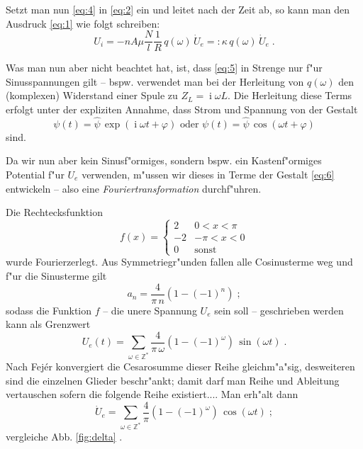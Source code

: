 \documentclass[a4paper,12pt]{article}
\newcommand{\I}{\ensuremath{\operatorname{i}}}
\newcommand{\abs}[0]{\bigskip\noindent}
\begin{document}
Setzt man nun  \eqref{eq:4} in \eqref{eq:2} ein und leitet nach der
Zeit ab, so kann man den Ausdruck \eqref{eq:1} wie folgt schreiben:
\begin{equation}
  \label{eq:5}
  U_i = - n A \mu \frac{N}{l} \frac{1}{R} \, q(\omega) \, \dot U_e =:
  \kappa \, q(\omega) \, \dot U_e \;.
\end{equation}

Was man nun aber nicht beachtet hat, ist, dass \eqref{eq:5} in Strenge
nur f"ur Sinusspannungen gilt -- bspw. verwendet man bei der
Herleitung von $q(\omega)$ den (komplexen) Widerstand einer Spule zu $Z_L = \I
\omega L$. Die Herleitung diese Terms erfolgt unter der expliziten
Annahme, dass Strom und Spannung von der Gestalt 
\begin{equation}
  \label{eq:6}
\psi(t) = \hat \psi \,\exp( \I \omega t + \varphi)  \text{ oder }
\psi(t) = \hat \psi \, \cos( \omega t + \varphi )
\end{equation}
sind.

\abs
Da wir nun aber kein Sinusf"ormiges, sondern bspw. ein Kastenf"ormiges
Potential f"ur $U_e$ verwenden, m"ussen wir dieses in Terme der
Gestalt \eqref{eq:6} entwickeln -- also eine
\emph{Fouriertransformation} durchf"uhren.

Die Rechtecksfunktion 
\begin{equation*}
  f(x) =
  \begin{cases}
    2 & 0 < x < \pi \\
    -2 & -\pi < x < 0 \\
    0 & \text{sonst}
  \end{cases}
\end{equation*}
wurde Fourierzerlegt. Aus Symmetriegr"unden fallen alle Cosinusterme
weg und f"ur die Sinusterme gilt
\begin{equation*}
  a_n = \frac{4}{\pi \, n} ( 1 - (-1)^n ) \;;
\end{equation*}
sodass die Funktion $f$ -- die unere Spannung $U_e$ sein soll -- geschrieben werden kann als Grenzwert 
\begin{equation}
  \label{eq:7}
  U_e(t) = \sum_{\omega \in \mathbb Z^\ast} \frac{4}{\pi \, \omega} ( 1 -
  (-1)^\omega ) \, \sin( \omega t) \;.
\end{equation}
Nach Fej\'er konvergiert die Cesarosumme dieser Reihe gleichm"a"sig,
desweiteren sind die einzelnen Glieder beschr"ankt; damit darf man
Reihe und Ableitung vertauschen sofern die folgende Reihe
existiert.... Man erh"alt dann
\begin{equation}
  \label{eq:8}
  \dot U_e = \sum_{\omega \in \mathbb Z^\ast} \frac{4}{\pi} ( 1 -
  (-1)^\omega ) \, \cos( \omega t) \;;
\end{equation}
vergleiche Abb. \ref{fig:delta} \;.
\end{document}
